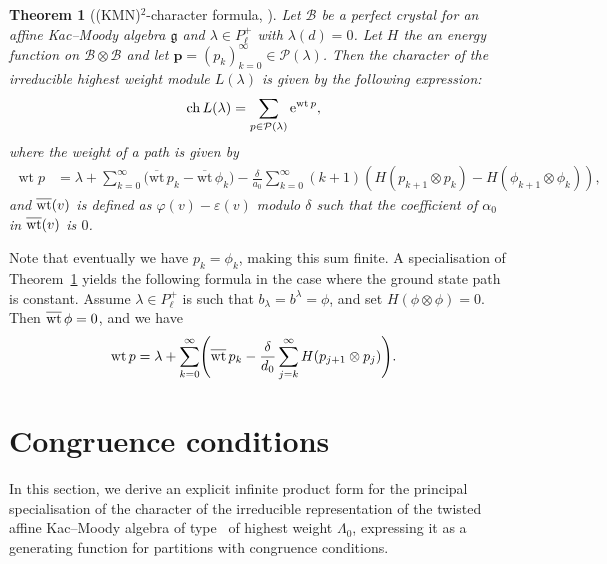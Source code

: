 \documentclass[10pt,a4paper]{amsart}
\numberwithin{equation}{section}
\newtheorem{Theorem}{Theorem}[section]
\theoremstyle{definition}
\begin{document}
\begin{Theorem}[(KMN)$^2$-character formula, \cite{KMN92}]\label{thm:KMN2}
Let $\mathcal{B}$ be a perfect crystal for an affine Kac--Moody algebra $\mathfrak{g}$ and $\lambda \in P_\ell^+$ with $\lambda(d)=0$. Let $H$ the an energy function on $\mathcal{B} \otimes \mathcal{B}$ and let $\mathbf{p} = (p_k)_{k=0}^{\infty} \in \mathcal{P}(\lambda)$. Then the character of the irreducible highest weight module $L(\lambda)$ is given by the following expression:
\begin{align*}
\operatorname{ch}L(\lambda)
&= \sum_{p \in \mathcal{P}(\lambda)} {\rm e}^{\operatorname{wt}p},
\end{align*}
where the weight of a path is given by
\begin{align*}
\operatorname{wt}p
&= \lambda + \sum_{k=0}^{\infty} \bigl( \overline{\mathrm{wt}}\,p_k - \overline{\mathrm{wt}}\,\phi_k \bigr) - \frac{\delta}{a_0} \sum_{k=0}^{\infty} (k+1) ( H(p_{k+1} \otimes p_k) - H(\phi_{k+1} \otimes \phi_k) ),
\end{align*}
and $\overline{{\rm wt}}(v)$ is defined as $\varphi(v) - \varepsilon(v)$ modulo $\delta$ such that the coefficient of $\alpha_0$ in $\overline{{\rm wt}}(v)$ is $0$.
\end{Theorem}

Note that eventually we have $p_k = \phi_k$, making this sum finite. A specialisation of Theorem~\ref{thm:KMN2} yields the following formula in the case where the ground state path is constant. Assume $\lambda \in P^+_\ell$ is such that $b_\lambda = b^\lambda = \phi$, and set $H(\phi \otimes \phi) = 0$. Then $\overline{{\rm wt}}\, \phi = 0$, and we have
\begin{align*}
\operatorname{wt}p &= \lambda + \sum_{k=0}^{\infty} \Biggl( \overline{{\rm wt}}\,p_k - \frac{\delta}{d_0} \sum_{j=k}^{\infty} H(p_{j+1} \otimes p_j) \Biggr).
\end{align*}


\section{Congruence conditions}\label{section:cong}

In this section, we derive an explicit infinite product form for the principal specialisation of the character of the irreducible representation of the twisted affine Kac--Moody algebra of type~ of highest weight $\Lambda_0$, expressing it as a generating function for partitions with congruence conditions.
\end{document}
